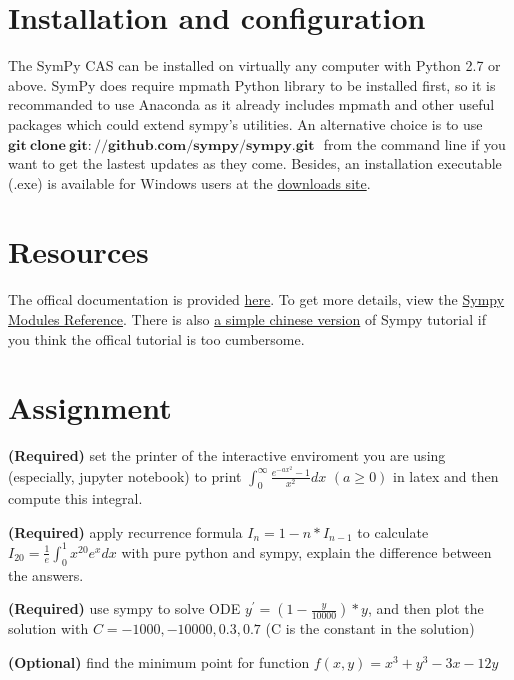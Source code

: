 \documentclass[english]{../TeXTemplate/pkupaper}
\title{\titlemark}
\author{Xiang Meng}
\date{\today}
\begin{document}
\maketitle

\section{Installation and configuration}
The SymPy CAS can be installed on virtually any computer with Python 2.7 or above. SymPy does require mpmath Python library to be installed first, so it is recommanded to use Anaconda as it already includes mpmath and
other useful packages which could extend sympy's utilities. An alternative choice is to use \,\,$\bm{git\ clone\ git://github.com/sympy/sympy.git}$\,\, from the command line if you want to get the lastest updates as they come.
Besides, an installation executable (.exe) is available for Windows users at the \href{https://github.com/sympy/sympy/releases}{downloads site}.

\section{Resources}
The offical documentation is provided \href{http://docs.sympy.org/latest/tutorial/index.html}{here}. To get more
details, view the \href{http://docs.sympy.org/latest/modules/index.html}{Sympy Modules Reference}. There is also
\href{http://ju.outofmemory.cn/entry/80895}{a simple chinese version} of Sympy tutorial if you think the offical tutorial is too cumbersome. 

\section{Assignment}
\begin{partlist}
\item \textbf{(Required)} set the printer of the interactive enviroment you are using (especially, jupyter notebook) to print $\int_{0}^{\infty} \frac{e^{-ax^2}-1}{x^2}dx\,\,(a\ge 0)$ in latex and then compute this integral.
\item \textbf{(Required)} apply recurrence formula $I_{n}=1-n*I_{n-1}$ to calculate $I_{20}=\frac{1}{e}\int_{0}^{1}x^{20}e^x dx$ with pure python and sympy, explain the difference between the answers.
\item \textbf{(Required)} use sympy to solve ODE $y^{'} = (1-\frac{y}{10000})*y$, and then plot the solution with $C=-1000, -10000, 0.3, 0.7$ (C is the constant in the solution)
\item \textbf{(Optional)} find the minimum point for function $f(x,y)=x^3+y^3-3x-12y$
\end{partlist}
\end{document}
